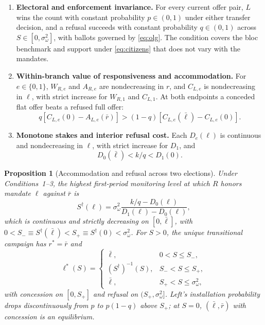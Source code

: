 \documentclass[11pt,letterpaper]{article}
\newtheorem{proposition}{Proposition}
\begin{document}
\begin{enumerate}
\item \textbf{Electoral and enforcement invariance.} For every current offer pair, $L$ wins the count with constant probability $p\in(0,1)$ under either transfer decision, and a refusal succeeds with constant probability $q\in(0,1)$ across $S\in[0,\sigma_\omega^2]$, with ballots governed by \eqref{eq:olg}. The condition covers the bloc benchmark and support under \eqref{eq:citizens} that does not vary with the mandates.
\item \textbf{Within-branch value of responsiveness and accommodation.} For $e\in\{0,1\}$, $W_{R,e}$ and $A_{R,e}$ are nondecreasing in $r$, and $C_{L,e}$ is nondecreasing in $\ell$, with strict increase for $W_{R,1}$ and $C_{L,1}$. At both endpoints a conceded flat offer beats a refused full offer:
\begin{equation}
 q[C_{L,e}(0)-A_{L,e}(\bar r)]>
 (1-q)[C_{L,e}(\bar\ell)-C_{L,e}(0)] .
 \label{eq:accommodate}
\end{equation}
\item \textbf{Monotone stakes and interior refusal cost.} Each $D_e(\ell)$ is continuous and nondecreasing in $\ell$, with strict increase for $D_1$, and
\begin{equation}
 D_0(\bar\ell)<k/q<D_1(0).
 \label{eq:costwindow}
\end{equation}
\end{enumerate}

\begin{proposition}[Accommodation and refusal across two elections]\label{prop:main}
Under Conditions~1--3, the highest first-period monitoring level at which $R$ honors mandate $\ell$ against $\bar r$ is
\begin{equation}
 S^\dagger(\ell)=
 \sigma_\omega^2\frac{k/q-D_0(\ell)}{D_1(\ell)-D_0(\ell)} ,
 \label{eq:generalcut}
\end{equation}
which is continuous and strictly decreasing on $[0,\bar\ell]$, with $0<S_-\equiv S^\dagger(\bar\ell)<S_+\equiv S^\dagger(0)<\sigma_\omega^2$. For $S>0$, the unique transitional campaign has $r^*=\bar r$ and
\begin{equation}
 \ell^*(S)=
 \begin{cases}
 \bar\ell, & 0<S\le S_-,\\
 (S^\dagger)^{-1}(S), & S_-<S\le S_+,\\
 \bar\ell, & S_+<S\le\sigma_\omega^2 ,
 \end{cases}
 \label{eq:genstar}
\end{equation}
with concession on $[0,S_+]$ and refusal on $(S_+,\sigma_\omega^2]$. Left's installation probability drops discontinuously from $p$ to $p(1-q)$ above $S_+$; at $S=0$, $(\bar\ell,\bar r)$ with concession is an equilibrium.
\end{proposition}
\end{document}
